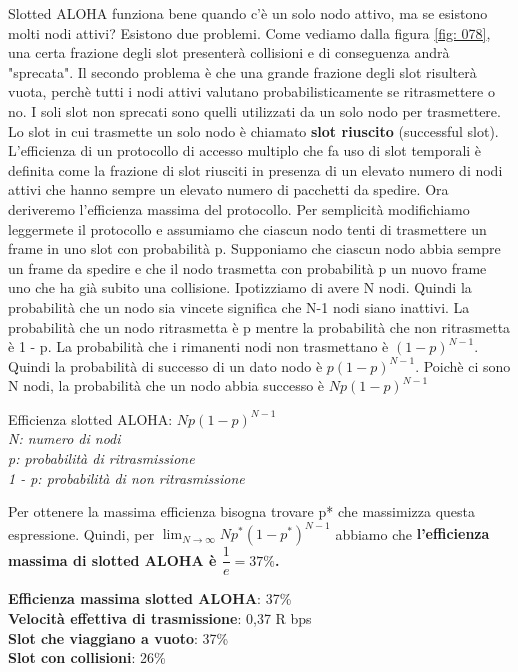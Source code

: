 \documentclass[11pt,a4paper]{article}
\begin{document}
Slotted ALOHA funziona bene quando c'è un solo nodo attivo, ma se esistono molti nodi attivi? Esistono due problemi. Come vediamo dalla figura \ref{fig: 078}, una certa frazione degli slot presenterà collisioni e di conseguenza andrà "sprecata". Il secondo problema è che una grande frazione degli slot risulterà vuota, perchè tutti i nodi attivi valutano probabilisticamente se ritrasmettere o no. I soli slot non sprecati sono quelli utilizzati da un solo nodo per trasmettere. Lo slot in cui trasmette un solo nodo è chiamato \textbf{slot riuscito} (successful slot). L'efficienza di un protocollo di accesso multiplo che fa uso di slot temporali è definita come la frazione di slot riusciti in presenza di un elevato numero di nodi attivi che hanno sempre un elevato numero di pacchetti da spedire. Ora deriveremo l'efficienza massima del  protocollo. Per semplicità modifichiamo leggermete il protocollo e assumiamo che ciascun nodo tenti di trasmettere un frame in uno slot con probabilità p. Supponiamo che ciascun nodo abbia sempre un frame da spedire e che il nodo trasmetta con probabilità p un nuovo frame  uno che ha già subito una collisione. Ipotizziamo di avere N nodi. Quindi la probabilità che un nodo sia vincete significa che N-1 nodi siano inattivi. La probabilità che un nodo ritrasmetta è p mentre la probabilità che non ritrasmetta è 1 - p. La probabilità che i rimanenti nodi non trasmettano è $(1 - p)^{N - 1}$. Quindi la probabilità di successo di un dato nodo è $p(1 - p)^{N - 1}$. Poichè ci sono N nodi, la probabilità che un nodo abbia successo è $Np(1 - p)^{N - 1}$
\begin{center}
	Efficienza slotted ALOHA: $Np(1 - p)^{N - 1}$ \\
	\textit{N: numero di nodi \\
		p: probabilità di ritrasmissione \\
		1 - p: probabilità di non ritrasmissione}
\end{center}
Per ottenere la massima efficienza bisogna trovare p* che massimizza questa espressione. Quindi, per $\lim_{N\to\infty} Np^{*}(1 - p^{*})^{N - 1}$ abbiamo che \textbf{l'efficienza massima di slotted ALOHA è $\dfrac{1}{e} =  37\%$.}
\begin{center}
	\textbf{Efficienza massima slotted ALOHA}: 37\% \\
	\textbf{Velocità effettiva di trasmissione}:  0,37 R bps \\
	\textbf{Slot che viaggiano a vuoto}: 37\% \\
	\textbf{Slot con collisioni}: 26\% \\ 
\end{center}
\end{document}
